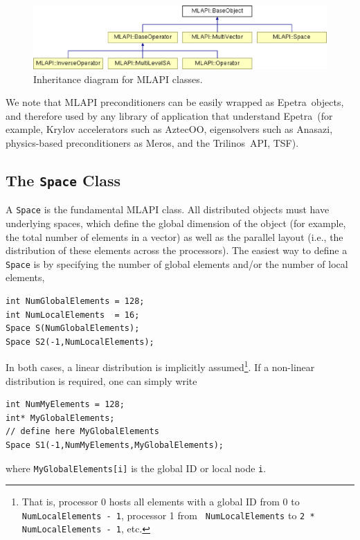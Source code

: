 \documentclass{article}[11pt]
\newcommand{\Aztecoo}  {{\sc AztecOO}}
\newcommand{\aztecoo}  {{\Aztecoo}}
\newcommand{\epetra}  {{\sc Epetra}}
\newcommand{\trilinos}  {{\sc Trilinos}}
\newcommand{\meros}  {{\sc Meros}}
\newcommand{\anasazi}  {{\sc Anasazi}}
\newcommand{\MLAPI}  {{\sc MLAPI }}
\begin{document}
\begin{figure}
\begin{center}
\includegraphics[width=12cm]{MLAPI_classes.eps}
\caption{Inheritance diagram for \MLAPI classes.}
\label{fig:in}
\end{center}
\end{figure}

We note that \MLAPI preconditioners can be easily wrapped as \epetra\ objects,
  and therefore used by any library of application that understand \epetra\
  (for example, Krylov accelerators such as \aztecoo, eigensolvers such as
   \anasazi, physics-based preconditioners as \meros, and the \trilinos\ API,
   TSF).

\subsection{The {\tt Space} Class}
\label{sec:space}

A {\tt Space} is the fundamental \MLAPI class. All distributed objects must have
underlying spaces, which define the global dimension of the object 
(for example, the total number of elements in a vector) as well as the
 parallel layout (i.e., the distribution of these elements across the
processors). The easiest way to define a {\tt Space} is by specifying the
number of global elements 
and/or the number of local elements,
\begin{verbatim}
int NumGlobalElements = 128;
int NumLocalElements  = 16;
Space S(NumGlobalElements);
Space S2(-1,NumLocalElements);
\end{verbatim}
In both cases, a linear distribution is implicitly 
assumed\footnote{That is, processor 0 hosts all elements with a global ID
  from 0 to {\tt NumLocalElements - 1}, processor 1 from {\tt
    NumLocalElements} to {\tt 2 * NumLocalElements - 1}, etc.}. If a non-linear
distribution is required, one can simply write
\begin{verbatim}
int NumMyElements = 128;
int* MyGlobalElements;
// define here MyGlobalElements
Space S1(-1,NumMyElements,MyGlobalElements);
\end{verbatim}
where {\tt MyGlobalElements[i]} is the global ID or local node {\tt i}.
\end{document}
